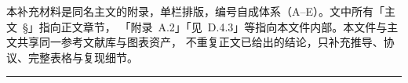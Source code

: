 \documentclass[onecolumn,11pt,a4paper]{article}
\title{%
  \zhconftitle{%
    补充材料\\
    \large 细节更多，却在漂移：无真值热成像多帧超分辨中的零空间幻觉
  }%
}
\author{\zhconfauthor{匿名作者（投稿前替换）}}
\date{}
\begin{document}
\maketitle

\noindent\small
本补充材料是同名主文的附录，单栏排版，编号自成体系（A--E）。文中所有「主文~\S」指向正文章节，
「附录~A.2」「见~D.4.3」等指向本文件内部。本文件与主文共享同一参考文献库与图表资产，
不重复正文已给出的结论，只补充推导、协议、完整表格与复现细节。
\normalsize

\medskip
\hrule
\medskip

\tableofcontents

\bigskip







% 
% 
\end{document}

